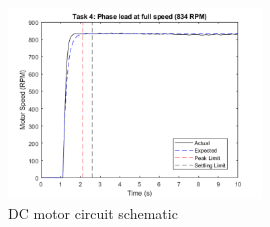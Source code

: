 \documentclass[11pt, onecolumn]{article}
\begin{document}
\begin{figure}[h!]
    \centering
    \includegraphics[width=0.6\textwidth]{q4-phase.png}
    \caption{DC motor circuit schematic \cite{article}}
    \label{fig:q4-phase}
\end{figure}
\newpage


\end{document}
